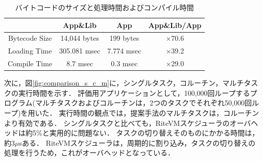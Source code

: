 \documentclass[submit,techrep]{ipsj}
\begin{document}

\begin{table}[t]
    \centering
    \caption{バイトコードのサイズと処理時間およびコンパイル時間}
    {\tabcolsep=0.1cm
    \begin{tabular}{c||c|c|c}
                            & App\&Lib     & App        &   App\&Lib/App  \\ \hline
          Bytecode Size     & 14,044 bytes & 199 bytes  &   $\times$70.6          \\ %
          Loading Time & 305.081 msec & 7.774 msec &   $\times$39.2          \\
          Compile Time      & 8.7 msec     & 0.3 msec   &   $\times$29.0          \\
    \end{tabular}
    }
    \vspace{-5mm}
    \label{tab:size_and_time}
\end{table}

次に，図\ref{fig:comparison_s_c_m}に，シングルタスク，コルーチン，マルチタスクの実行時間を示す．
評価用アプリケーションとして，100,000回ループするプログラム(マルチタスクおよびコルーチンは，2つのタスクでそれぞれ50,000回ループ)を用いた．
実行時間の観点では，提案手法のマルチタスクは，コルーチンより有効である．
シングルタスクと比べても，RiteVMスケジューラのオーバヘッドは約5\%と実用的に問題ない．
タスクの切り替えそのものにかかる時間は，約3$\mu$sある．
RiteVMスケジューラは，周期的に割り込み，タスクの切り替えの処理を行うため，これがオーバヘッドとなっている．
\end{document}
